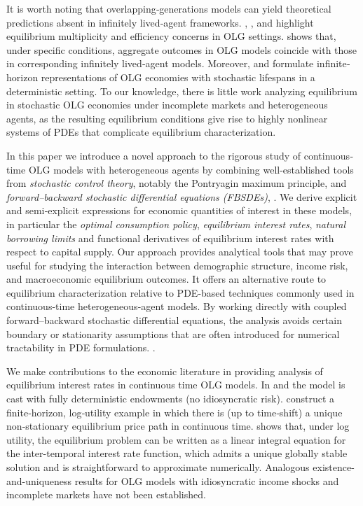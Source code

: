 \documentclass[11pt,oneside,english,reqno,dvipsnames,table]{amsart}
\numberwithin{equation}{section}
\theoremstyle{plain}
\theoremstyle{definition}
\theoremstyle{remark}
\theoremstyle{plain}
\theoremstyle{plain}
\theoremstyle{plain}
\theoremstyle{plain}
\theoremstyle{plain}
\theoremstyle{plain}
\theoremstyle{plain}
\numberwithin{thm}{section}
\begin{document}
It is worth noting that overlapping‐generations models can yield theoretical predictions absent in infinitely lived‐agent frameworks. \cite{galorryder1989}, \cite{cass1972}, and \cite{shell1971} highlight equilibrium multiplicity and efficiency concerns in OLG settings. \cite{aiyagari_85_observational} shows that, under specific conditions, aggregate outcomes in OLG models coincide with those in corresponding infinitely lived‐agent models. Moreover, \cite{yaari1965} and \cite{blanchard1985} formulate infinite‐horizon representations of OLG economies with stochastic lifespans in a deterministic setting.  To our knowledge, there is little work analyzing equilibrium in stochastic OLG economies under incomplete markets and heterogeneous agents, as the resulting equilibrium conditions give rise to highly nonlinear systems of PDEs that complicate equilibrium characterization.

In this paper we introduce a novel approach to the rigorous study of continuous‐time OLG models with heterogeneous agents by combining well-established tools from \textit{stochastic control theory}, notably the Pontryagin maximum principle, and \textit{forward–backward stochastic differential equations (FBSDEs)}, \cite{pardoux_peng_90_adapted, antonelli_93_backward,yong_zhou_99_stochastic,delarue_02_existence,zhang_17_backward}. We derive explicit and semi‐explicit expressions for economic quantities of interest in these models, in particular the \emph{optimal consumption policy}, \emph{equilibrium interest rates}, \emph{natural borrowing limits} and functional derivatives of equilibrium interest rates with respect to capital supply. Our approach provides analytical tools that may prove useful for studying the interaction between demographic structure, income risk, and macroeconomic equilibrium outcomes. It offers an alternative route to equilibrium characterization relative to PDE-based techniques commonly used in continuous-time heterogeneous-agent models. By working directly with coupled forward–backward stochastic differential equations, the analysis avoids certain boundary or stationarity assumptions that are often introduced for numerical tractability in PDE formulations. \cite{huggett_93_risk_free, aiyagari_94_uninsured,achdou_han_lasry_lions_moll_21_income, ambrose_21_existence}.

 We make contributions to the economic literature in providing analysis of equilibrium interest rates in continuous time OLG models. In \cite{DemichelisPolemarchakis2007_OLG} and \cite{Edmond2008_OLG} the model is cast with fully deterministic endowments (no idiosyncratic risk). \cite{DemichelisPolemarchakis2007_OLG} construct a finite‑horizon, log‑utility example in which there is (up to time‑shift) a unique non‑stationary equilibrium price path in continuous time. \cite{Edmond2008_OLG} shows that, under log utility, the equilibrium problem can be written as a linear integral equation for the inter-temporal interest rate function, which admits a unique globally stable solution and is straightforward to approximate numerically.  Analogous existence-and-uniqueness results for OLG models with idiosyncratic income shocks and incomplete markets have not been established.  
\end{document}
